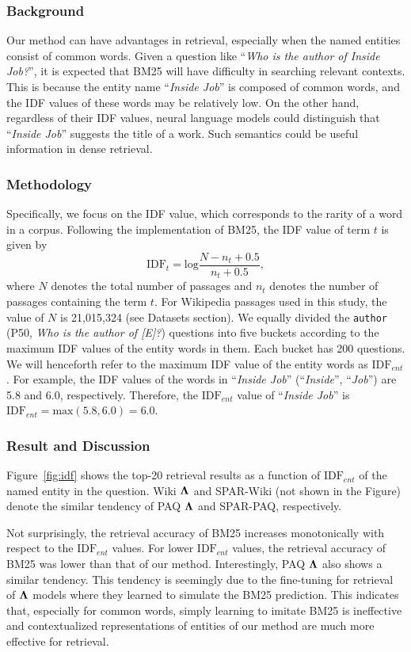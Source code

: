 \documentclass[letterpaper]{article} \usepackage{aaai23}  \usepackage{times}  \usepackage{helvet}  \usepackage{courier}  \usepackage[hyphens]{url}  \usepackage{graphicx} \urlstyle{rm} \def\UrlFont{\rm}  \usepackage{natbib}  \usepackage{caption} \frenchspacing  \setlength{\pdfpagewidth}{8.5in}  \setlength{\pdfpageheight}{11in}  \usepackage{algorithm}
\begin{document}
\subsubsection{Background}
Our method can have advantages in retrieval, especially when the named entities consist of common words.
Given a question like ``\textit{Who is the author of Inside Job?}'', it is expected that BM25 will have difficulty in searching relevant contexts.
This is because the entity name ``\textit{Inside Job}'' is composed of common words, and the IDF values of these words may be relatively low.
On the other hand, regardless of their IDF values, neural language models could distinguish that ``\textit{Inside Job}'' suggests the title of a work.
Such semantics could be useful information in dense retrieval.

\subsubsection{Methodology}
Specifically, we focus on the IDF value, which corresponds to the rarity of a word in a corpus.
Following the implementation of BM25, the IDF value of term $t$ is given by
$$ \mathrm{IDF}_t = \mathrm{log}\frac{N - n_t + 0.5}{n_t + 0.5} ,$$
where $N$ denotes the total number of passages and $n_t$ denotes the number of passages containing the term $t$.
For Wikipedia passages used in this study, the value of $N$ is 21,015,324 (see Datasets section).
We equally divided the \texttt{\small author} (P50, \textit{Who is the author of [E]?}) questions into five buckets according to the maximum IDF values of the entity words in them.
Each bucket has 200 questions.
We will henceforth refer to the maximum IDF value of the entity words as $\mathrm{IDF}_{ent}$.
For example, the IDF values of the words in ``\textit{Inside Job}'' (``\textit{Inside}'', ``\textit{Job}'') are 5.8 and 6.0, respectively.
Therefore, the $\mathrm{IDF}_{ent}$ value of ``\textit{Inside Job}'' is $\mathrm{IDF}_{ent} = \mathrm{max}(5.8, 6.0) = 6.0$.

\subsubsection{Result and Discussion}
Figure~\ref{fig:idf} shows the top-20 retrieval results as a function of $\mathrm{IDF}_{ent}$ of the named entity in the question.
Wiki $\bf{\Lambda}$ and SPAR-Wiki (not shown in the Figure) denote the similar tendency of PAQ $\bf{\Lambda}$ and SPAR-PAQ, respectively.

Not surprisingly, the retrieval accuracy of BM25 increases monotonically with respect to the $\mathrm{IDF}_{ent}$ values.
For lower $\mathrm{IDF}_{ent}$ values, the retrieval accuracy of BM25 was lower than that of our method.
Interestingly, PAQ $\bf{\Lambda}$ also shows a similar tendency.
This tendency is seemingly due to the fine-tuning for retrieval of $\bf{\Lambda}$ models where they learned to simulate the BM25 prediction.
This indicates that, especially for common words, simply learning to imitate BM25 is ineffective and contextualized representations of entities of our method are much more effective for retrieval.
\end{document}
